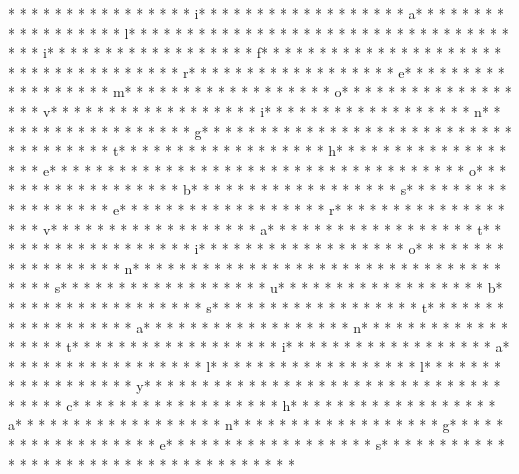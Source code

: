 *  * * *  * * *  *  * * *  *  * * *  * i* * *  * * *  * * *  *  * * *  *  * * *  * a* * *  * * *  * * *  *  * * *  *  * * *  * l* * *  * * *  * * *  *  * * *  *  * * *  *  * * *  * * *  * * *  *  * * *  *  * * *  * i* * *  * * *  * * *  *  * * *  *  * * *  * f* * *  * * *  * * *  *  * * *  *  * * *  *  * * *  * * *  * * *  *  * * *  *  * * *  * r* * *  * * *  * * *  *  * * *  *  * * *  * e* * *  * * *  * * *  *  * * *  *  * * *  * m* * *  * * *  * * *  *  * * *  *  * * *  * o* * *  * * *  * * *  *  * * *  *  * * *  * v* * *  * * *  * * *  *  * * *  *  * * *  * i* * *  * * *  * * *  *  * * *  *  * * *  * n* * *  * * *  * * *  *  * * *  *  * * *  * g* * *  * * *  * * *  *  * * *  *  * * *  *  * * *  * * *  * * *  *  * * *  *  * * *  * t* * *  * * *  * * *  *  * * *  *  * * *  * h* * *  * * *  * * *  *  * * *  *  * * *  * e* * *  * * *  * * *  *  * * *  *  * * *  *  * * *  * * *  * * *  *  * * *  *  * * *  * o* * *  * * *  * * *  *  * * *  *  * * *  * b* * *  * * *  * * *  *  * * *  *  * * *  * s* * *  * * *  * * *  *  * * *  *  * * *  * e* * *  * * *  * * *  *  * * *  *  * * *  * r* * *  * * *  * * *  *  * * *  *  * * *  * v* * *  * * *  * * *  *  * * *  *  * * *  * a* * *  * * *  * * *  *  * * *  *  * * *  * t* * *  * * *  * * *  *  * * *  *  * * *  * i* * *  * * *  * * *  *  * * *  *  * * *  * o* * *  * * *  * * *  *  * * *  *  * * *  * n* * *  * * *  * * *  *  * * *  *  * * *  *  * * *  * * *  * * *  *  * * *  *  * * *  * s* * *  * * *  * * *  *  * * *  *  * * *  * u* * *  * * *  * * *  *  * * *  *  * * *  * b* * *  * * *  * * *  *  * * *  *  * * *  * s* * *  * * *  * * *  *  * * *  *  * * *  * t* * *  * * *  * * *  *  * * *  *  * * *  * a* * *  * * *  * * *  *  * * *  *  * * *  * n* * *  * * *  * * *  *  * * *  *  * * *  * t* * *  * * *  * * *  *  * * *  *  * * *  * i* * *  * * *  * * *  *  * * *  *  * * *  * a* * *  * * *  * * *  *  * * *  *  * * *  * l* * *  * * *  * * *  *  * * *  *  * * *  * l* * *  * * *  * * *  *  * * *  *  * * *  * y* * *  * * *  * * *  *  * * *  *  * * *  *  * * *  * * *  * * *  *  * * *  *  * * *  * c* * *  * * *  * * *  *  * * *  *  * * *  * h* * *  * * *  * * *  *  * * *  *  * * *  * a* * *  * * *  * * *  *  * * *  *  * * *  * n* * *  * * *  * * *  *  * * *  *  * * *  * g* * *  * * *  * * *  *  * * *  *  * * *  * e* * *  * * *  * * *  *  * * *  *  * * *  * s* * *  * * *  * * *  *  * * *  *  * * *  *  * * *  * * *  * * *  *  * * *  *  * * *  * 
